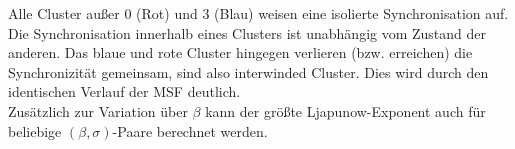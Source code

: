 Alle Cluster außer 0 (Rot) und 3 (Blau) weisen eine isolierte Synchronisation auf. Die Synchronisation innerhalb eines Clusters ist unabhängig vom Zustand der anderen. Das blaue und rote Cluster hingegen verlieren (bzw. erreichen) die Synchronizität gemeinsam, sind also interwinded Cluster. Dies wird durch den identischen Verlauf der MSF deutlich.\\
Zusätzlich zur Variation über $\beta$ kann der größte Ljapunow-Exponent auch für beliebige $(\beta,\sigma)$-Paare berechnet werden.
\begin{figure}[h]
	\centering
	\\
\end{figure}
